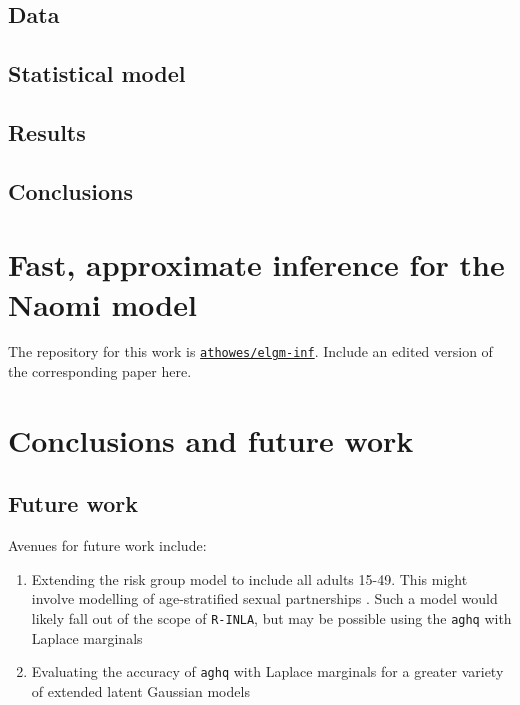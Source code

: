 \documentclass[a4paper, nobind]{templates/ociamthesis}
\providecommand{\tightlist}{%
  \setlength{\itemsep}{0pt}\setlength{\parskip}{0pt}}
\begin{document}
\hypertarget{data}{%
\section{Data}\label{data}}

\hypertarget{statistical-model}{%
\section{Statistical model}\label{statistical-model}}

\hypertarget{results}{%
\section{Results}\label{results}}

\hypertarget{conclusions}{%
\section{Conclusions}\label{conclusions}}

\hypertarget{fast-approximate-inference-for-the-naomi-model}{%
\chapter{Fast, approximate inference for the Naomi model}\label{fast-approximate-inference-for-the-naomi-model}}

\adjustmtc
{}

The repository for this work is \href{https://github.com/athowes/elgm-inf}{\texttt{athowes/elgm-inf}}.
Include an edited version of the corresponding paper here.

\hypertarget{conclusions-and-future-work}{%
\chapter{Conclusions and future work}\label{conclusions-and-future-work}}

\adjustmtc
{}

\hypertarget{future-work}{%
\section{Future work}\label{future-work}}

Avenues for future work include:

\begin{enumerate}
\def\labelenumi{\arabic{enumi}.}
\tightlist
\item
  Extending the risk group model to include all adults 15-49. This might involve modelling of age-stratified sexual partnerships \autocite{wolock2021evaluating}. Such a model would likely fall out of the scope of \texttt{R-INLA}, but may be possible using the \texttt{aghq} with Laplace marginals
\item
  Evaluating the accuracy of \texttt{aghq} with Laplace marginals for a greater variety of extended latent Gaussian models
\end{enumerate}
\end{document}
